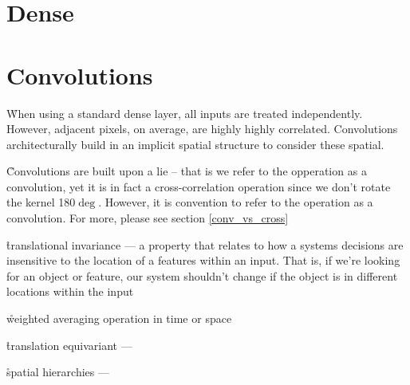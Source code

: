 
\section{Dense}


\section{Convolutions}


\r{When using a standard dense layer, all inputs are treated independently. However, adjacent pixels, on average, are highly highly correlated. Convolutions architecturally build in an implicit spatial structure to consider these spatial.}




\r{Convolutions are built upon a lie -- that is we refer to the opperation as a convolution, yet it is in fact a cross-correlation operation since we don't rotate the kernel 180$\deg$. However, it is convention to refer to the operation as a convolution. For more, please see section \ref{conv_vs_cross}}

\r{translational invariance --- a property that relates to how a systems decisions are insensitive to the location of a features within an input. That is, if we're looking for an object or feature, our system shouldn't change if the object is in different locations within the input}






\r{weighted averaging operation in time or space}


\r{translation equivariant --- }


\r{spatial hierarchies --- }


